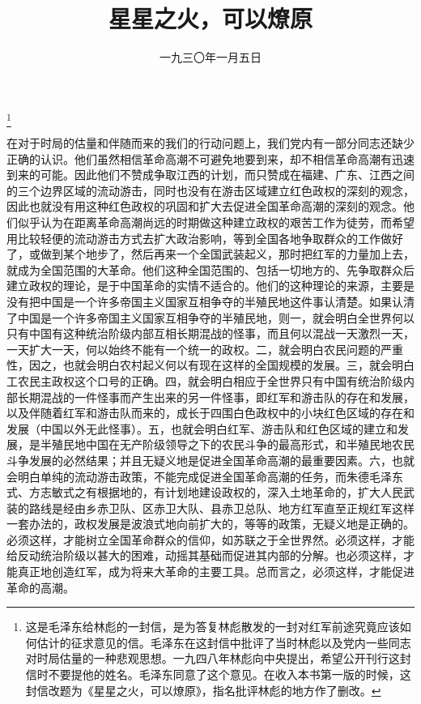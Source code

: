 
\title{星星之火，可以燎原}
\date{一九三〇年一月五日}
\thanks{这是毛泽东给林彪的一封信，是为答复林彪散发的一封对红军前途究竟应该如何估计的征求意见的信。毛泽东在这封信中批评了当时林彪以及党内一些同志对时局估量的一种悲观思想。一九四八年林彪向中央提出，希望公开刊行这封信时不要提他的姓名。毛泽东同意了这个意见。在收入本书第一版的时候，这封信改题为《星星之火，可以燎原》，指名批评林彪的地方作了删改。}
\maketitle


在对于时局的估量和伴随而来的我们的行动问题上，我们党内有一部分同志还缺少正确的认识。他们虽然相信革命高潮不可避免地要到来，却不相信革命高潮有迅速到来的可能。因此他们不赞成争取江西的计划，而只赞成在福建、广东、江西之间的三个边界区域的流动游击，同时也没有在游击区域建立红色政权的深刻的观念，因此也就没有用这种红色政权的巩固和扩大去促进全国革命高潮的深刻的观念。他们似乎认为在距离革命高潮尚远的时期做这种建立政权的艰苦工作为徒劳，而希望用比较轻便的流动游击方式去扩大政治影响，等到全国各地争取群众的工作做好了，或做到某个地步了，然后再来一个全国武装起义，那时把红军的力量加上去，就成为全国范围的大革命。他们这种全国范围的、包括一切地方的、先争取群众后建立政权的理论，是于中国革命的实情不适合的。他们的这种理论的来源，主要是没有把中国是一个许多帝国主义国家互相争夺的半殖民地这件事认清楚。如果认清了中国是一个许多帝国主义国家互相争夺的半殖民地，则一，就会明白全世界何以只有中国有这种统治阶级内部互相长期混战的怪事，而且何以混战一天激烈一天，一天扩大一天，何以始终不能有一个统一的政权。二，就会明白农民问题的严重性，因之，也就会明白农村起义何以有现在这样的全国规模的发展。三，就会明白工农民主政权这个口号的正确。四，就会明白相应于全世界只有中国有统治阶级内部长期混战的一件怪事而产生出来的另一件怪事，即红军和游击队的存在和发展，以及伴随着红军和游击队而来的，成长于四围白色政权中的小块红色区域的存在和发展（中国以外无此怪事）。五，也就会明白红军、游击队和红色区域的建立和发展，是半殖民地中国在无产阶级领导之下的农民斗争的最高形式，和半殖民地农民斗争发展的必然结果；并且无疑义地是促进全国革命高潮的最重要因素。六，也就会明白单纯的流动游击政策，不能完成促进全国革命高潮的任务，而朱德毛泽东式、方志敏式之有根据地的，有计划地建设政权的，深入土地革命的，扩大人民武装的路线是经由乡赤卫队、区赤卫大队、县赤卫总队、地方红军直至正规红军这样一套办法的，政权发展是波浪式地向前扩大的，等等的政策，无疑义地是正确的。必须这样，才能树立全国革命群众的信仰，如苏联之于全世界然。必须这样，才能给反动统治阶级以甚大的困难，动摇其基础而促进其内部的分解。也必须这样，才能真正地创造红军，成为将来大革命的主要工具。总而言之，必须这样，才能促进革命的高潮。

